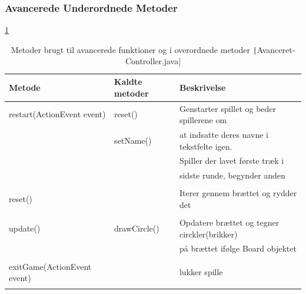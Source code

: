 \subsubsection{Avancerede Underordnede Metoder}
\cref{tbl:2}
\begin{table}[H]
    \centering
    \caption{Metoder brugt til avancerede funktioner og i overordnede metoder \texttt|Avanceret-Controller.java|}\label{tbl:2}
    \begin{tabular}{lll}
        \toprule
        Metode                               & Kaldte metoder  & Beskrivelse                                               \\
        \midrule
        restart(ActionEvent event)           & reset()         & Genstarter spillet og beder spillerene om                 \\
                                             & setName()       & at indsatte deres navne  i tekstfelte igen.               \\
                                             &                 & Spiller der lavet første træk i                           \\
                                             &                 & sidste runde, begynder anden                              \\
                                             &                 &                                                           \\
        reset()                              &                 & Iterer gennem brættet og rydder det                       \\
                                             &                 &                                                           \\
        update()                             & drawCircle()    & Opdatere brættet og tegner circkler(brikker)              \\
                                             &                 & på brættet ifølge Board objektet                          \\
                                             &                 &                                                           \\
        exitGame(ActionEvent event)          &                 & lukker spille                                             \\
                                             &                 &                                                           \\

\end{tabular}
\end{table}
